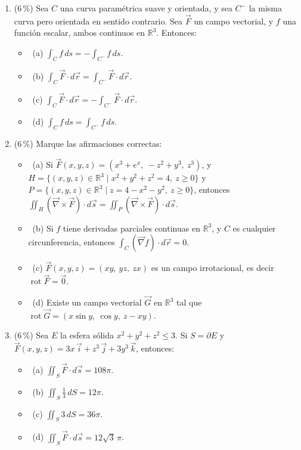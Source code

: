 \documentclass[11pt]{article}
\begin{document}
\begin{enumerate}
\item{} (6\,\%) Sea $C$ una curva paramétrica suave y orientada, y sea $C^-$ la misma curva pero orientada en sentido contrario. Sea $\vec F$ un campo vectorial, y $f$ una función escalar, ambos continuos en $\mathbb{R}^3$. Entonces:
\begin{itemize}
\item[] \fbox{\phantom{x}}\ (a) $\displaystyle \int_C f\,ds = -\int_{C^-} f\,ds$.
\item[] \fbox{\phantom{x}}\ (b) $\displaystyle \int_C \vec F \cdot d\vec r = \int_{C^-} \vec F \cdot d\vec r$.
\item[] \fbox{\phantom{x}}\ (c) $\displaystyle \int_C \vec F \cdot d\vec r = -\int_{C^-} \vec F \cdot d\vec r$.
\item[] \fbox{\phantom{x}}\ (d) $\displaystyle \int_C f\,ds = \int_{C^-} f\,ds$.
\end{itemize}

\item{} (6\,\%) Marque las afirmaciones correctas:
\begin{itemize}
\item[] \fbox{\phantom{x}}\ (a) Si $\vec F(x,y,z) = (x^3+e^x,\ -z^2+y^3,\ z^3)$, y $H = \{(x,y,z)\in\mathbb{R}^3 \mid x^2+y^2+z^2 = 4,\ z \geq 0\}$ y $P = \{(x,y,z)\in\mathbb{R}^3 \mid z = 4-x^2-y^2,\ z \geq 0\}$, entonces $\displaystyle \iint_H (\vec\nabla \times \vec F)\cdot d\vec s = \iint_P (\vec\nabla \times \vec F)\cdot d\vec s$.
\item[] \fbox{\phantom{x}}\ (b) Si $f$ tiene derivadas parciales continuas en $\mathbb{R}^3$, y $C$ es cualquier circunferencia, entonces $\displaystyle \int_C (\vec\nabla f)\cdot d\vec r = 0$.
\item[] \fbox{\phantom{x}}\ (c) $\vec F(x,y,z) = (xy,\ yz,\ zx)$ es un campo irrotacional, es decir $\operatorname{rot}\vec F = \vec 0$.
\item[] \fbox{\phantom{x}}\ (d) Existe un campo vectorial $\vec G$ en $\mathbb{R}^3$ tal que $\operatorname{rot}\vec G = (x\sin y,\ \cos y,\ z - xy)$.
\end{itemize}

\item{} (6\,\%) Sea $E$ la esfera sólida $x^2+y^2+z^2 \leq 3$. Si $S = \partial E$ y $\vec F(x,y,z) = 3x\,\vec i + z^3\,\vec j + 3y^3\,\vec k$, entonces:
\begin{itemize}
\item[] \fbox{\phantom{x}}\ (a) $\displaystyle \iint_S \vec F \cdot d\vec s = 108\pi$.
\item[] \fbox{\phantom{x}}\ (b) $\displaystyle \iint_S \tfrac13\,dS = 12\pi$.
\item[] \fbox{\phantom{x}}\ (c) $\displaystyle \iint_S 3\,dS = 36\pi$.
\item[] \fbox{\phantom{x}}\ (d) $\displaystyle \iint_S \vec F \cdot d\vec s = 12\sqrt3\,\pi$.
\end{itemize}


\end{enumerate}
\end{document}
